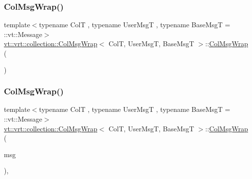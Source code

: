 \subsubsection{\texorpdfstring{Col\+Msg\+Wrap()}{ColMsgWrap()}\hspace{0.1cm}{\footnotesize\ttfamily [1/3]}}
{\footnotesize\ttfamily template$<$typename ColT , typename User\+MsgT , typename Base\+MsgT  = \+::vt\+::\+Message$>$ \\
\hyperlink{structvt_1_1vrt_1_1collection_1_1_col_msg_wrap}{vt\+::vrt\+::collection\+::\+Col\+Msg\+Wrap}$<$ ColT, User\+MsgT, Base\+MsgT $>$\+::\hyperlink{structvt_1_1vrt_1_1collection_1_1_col_msg_wrap}{Col\+Msg\+Wrap} (\begin{DoxyParamCaption}{ }\end{DoxyParamCaption})\hspace{0.3cm}{\ttfamily [default]}}

\mbox{\label{structvt_1_1vrt_1_1collection_1_1_col_msg_wrap_a9dfc351adf1f31fda9028608d989ce5c}} 
\subsubsection{\texorpdfstring{Col\+Msg\+Wrap()}{ColMsgWrap()}\hspace{0.1cm}{\footnotesize\ttfamily [2/3]}}
{\footnotesize\ttfamily template$<$typename ColT , typename User\+MsgT , typename Base\+MsgT  = \+::vt\+::\+Message$>$ \\
\hyperlink{structvt_1_1vrt_1_1collection_1_1_col_msg_wrap}{vt\+::vrt\+::collection\+::\+Col\+Msg\+Wrap}$<$ ColT, User\+MsgT, Base\+MsgT $>$\+::\hyperlink{structvt_1_1vrt_1_1collection_1_1_col_msg_wrap}{Col\+Msg\+Wrap} (\begin{DoxyParamCaption}\item[{User\+MsgT \&\&}]{msg }\end{DoxyParamCaption})\hspace{0.3cm}{\ttfamily [inline]}, {\ttfamily [explicit]}}

\mbox{\label{structvt_1_1vrt_1_1collection_1_1_col_msg_wrap_ac19f3573a80a849d41fd5874fe94414a}} 

